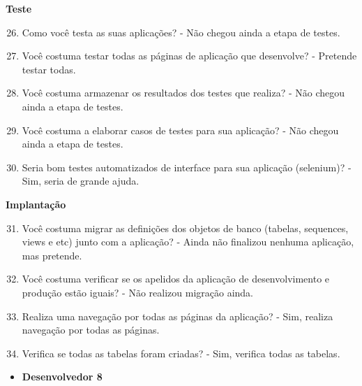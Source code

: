 \begin{apendicesenv}
\textbf{Teste}

\begin{enumerate}
	\setcounter{enumi}{25}
	\item Como você testa as suas aplicações?\newline
	- Não chegou ainda a etapa de testes.
	\item Você costuma testar todas as páginas de aplicação que desenvolve?\newline
	- Pretende testar todas.
	\item Você costuma armazenar os resultados dos testes que realiza?\newline
	- Não chegou ainda a etapa de testes.
	\item Você costuma a elaborar casos de testes para sua aplicação?\newline
	- Não chegou ainda a etapa de testes.
	\item Seria bom testes automatizados de interface para sua aplicação (selenium)?\newline
	- Sim, seria de grande ajuda.
\end{enumerate}

\textbf{Implantação}

\begin{enumerate}
	\setcounter{enumi}{30}
	\item Você costuma migrar as definições dos objetos de banco (tabelas, sequences, views e
	etc) junto com a aplicação?\newline
	- Ainda não finalizou nenhuma aplicação, mas pretende.
	\item Você costuma verificar se os apelidos da aplicação de desenvolvimento e produção
	estão iguais?\newline
	- Não realizou migração ainda.
	\item Realiza uma navegação por todas as páginas da aplicação?\newline
	- Sim, realiza navegação por todas as páginas.
	\item Verifica se todas as tabelas foram criadas?\newline
	- Sim, verifica todas as tabelas.
\end{enumerate}



\begin{itemize}
	\item \textbf{Desenvolvedor 8}
\end{itemize}


\end{apendicesenv}
